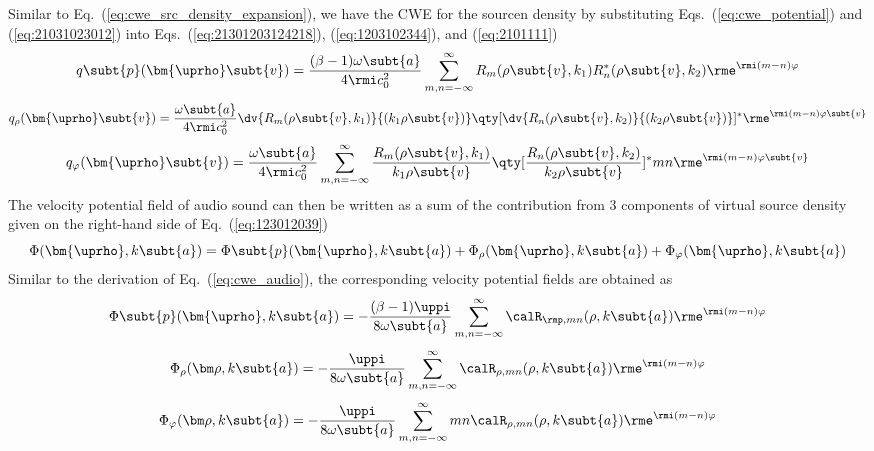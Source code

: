Similar to Eq.~(\ref{eq:cwe_src_density_expansion}), we have the CWE for the sourcen density by substituting Eqs.~(\ref{eq:cwe_potential}) and (\ref{eq:21031023012}) into Eqs.~(\ref{eq:21301203124218}), (\ref{eq:1203102344}), and (\ref{eq:2101111}) 
\begin{equation}
    q\subt{p}(\bm{\uprho}\subt{v})
    =
    \frac{(\beta-1)\omega\subt{a}}{4\rmi c_0^2}
    \sum_{m,n=-\infty}^\infty
    R_m(\rho\subt{v},k_1)
    R_n^*(\rho\subt{v},k_2)
    \rme^{\rmi(m-n)\varphi}
    \label{eq:10238488}
\end{equation}
\begin{equation}
    q_\rho(\bm{\uprho}\subt{v})
    =
    \frac{\omega\subt{a}}{4\rmi c_0^2}
    \dv{R_m(\rho\subt{v},k_1)}{(k_1\rho\subt{v})}
    \qty[\dv{R_n(\rho\subt{v},k_2)}{(k_2\rho\subt{v})}]^*
    \rme^{\rmi(m-n)\varphi\subt{v}}
    \label{eq:12032999}
\end{equation}
\begin{equation}
    q_\varphi(\bm{\uprho}\subt{v})
    =
    \frac{\omega\subt{a}}{4\rmi c_0^2}
    \sum_{m,n=-\infty}^\infty
    \frac{R_m(\rho\subt{v},k_1)}{k_1\rho\subt{v}}
    \qty[\frac{R_n(\rho\subt{v},k_2)}{k_2\rho\subt{v}}]^*
    mn
    \rme^{\rmi (m-n)\varphi\subt{v}}
    \label{eq:11111111113}
\end{equation}
The velocity potential field of audio sound can then be written as a sum of the contribution
from 3 components of virtual source density given on the right-hand side of Eq.~(\ref{eq:123012039})
\begin{equation}
    \Phi(\bm{\uprho},k\subt{a})
    =
    \Phi\subt{p}(\bm{\uprho}, k\subt{a})
    +
    \Phi_\rho(\bm{\uprho}, k\subt{a})
    +
    \Phi_\varphi(\bm{\uprho}, k\subt{a})
    \label{eq:10vcjdf023}
\end{equation}
Similar to the derivation of Eq.~(\ref{eq:cwe_audio}), 
the corresponding velocity potential fields are obtained as
\begin{equation}
    \Phi\subt{p}(\bm{\uprho},k\subt{a})
    =
    -\frac{(\beta-1)\uppi }{8\omega\subt{a} }
    \sum_{m,n=-\infty}^\infty
    \calR_{\rmp,mn}(\rho,k\subt{a})
    \rme^{\rmi(m-n)\varphi}
    \label{eq:31249fd}
\end{equation}
\begin{equation}
    \Phi_\rho(\bm\rho,k\subt{a})
    =
    -\frac{\uppi}{8\omega\subt{a}}
    \sum_{m,n=-\infty}^\infty
    \calR_{\rho,mn}(\rho,k\subt{a})
    \rme^{\rmi (m-n)\varphi}
    \label{eq:12310fdp}
\end{equation}
\begin{equation}
    \Phi_\varphi(\bm\rho,k\subt{a})
    =
    -\frac{\uppi}{8\omega\subt{a}}
    \sum_{m,n=-\infty}^\infty
    mn
    \calR_{\rho,mn}(\rho,k\subt{a})
    \rme^{\rmi (m-n)\varphi}
    \label{eq:30fdfp2}
\end{equation}

